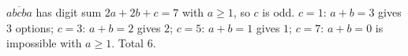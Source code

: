 $\overline{abcba}$ has digit sum $2a+2b+c=7$ with $a\ge1$, so $c$ is odd. $c=1$: $a+b=3$ gives $3$ options; $c=3$: $a+b=2$ gives $2$; $c=5$: $a+b=1$ gives $1$; $c=7$: $a+b=0$ is impossible with $a\ge1$. Total $\boxed{6}$.
